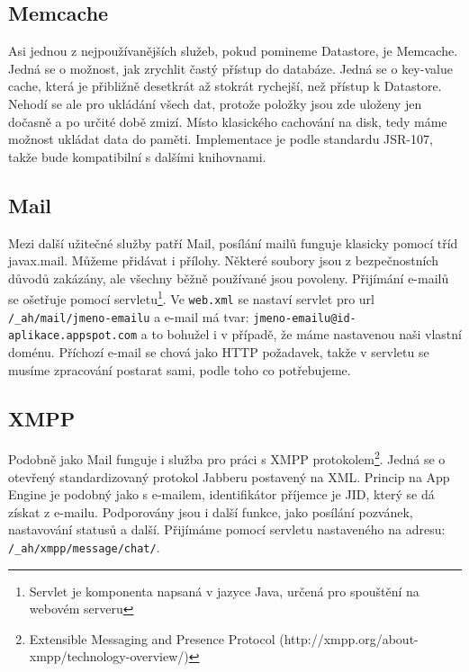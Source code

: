 \subsection{Memcache}
Asi jednou z nejpoužívanějších služeb, pokud pomineme Datastore, je Memcache. Jedná se o možnost, jak zrychlit častý přístup do databáze. Jedná se o key-value cache, která je přibližně desetkrát až stokrát rychejší, než přístup k Datastore. Nehodí se ale pro ukládání všech dat, protože položky jsou zde uloženy jen dočasně a po určité době zmizí. Místo klasického cachování na disk, tedy máme možnost ukládat data do paměti. Implementace je podle standardu JSR-107, takže bude kompatibilní s dalšími knihovnami.

\subsection{Mail}
Mezi další užitečné služby patří Mail, posílání mailů funguje klasicky pomocí tříd javax.mail. Můžeme přidávat i přílohy. Některé soubory jsou z bezpečnostních důvodů zakázány, ale všechny běžně používané jsou povoleny. Přijímání e-mailů se ošetřuje pomocí servletu\footnote{Servlet je komponenta napsaná v jazyce Java, určená pro spouštění na webovém serveru}. Ve \verb|web.xml| se nastaví servlet pro url \verb|/_ah/mail/jmeno-emailu| a e-mail má tvar: \verb|jmeno-emailu@id-aplikace.appspot.com| a to bohužel i v případě, že máme nastavenou naši vlastní doménu. Příchozí e-mail se chová jako HTTP požadavek, takže v servletu se musíme zpracování postarat sami, podle toho co potřebujeme. 

\subsection{XMPP}
Podobně jako Mail funguje i služba pro práci s XMPP protokolem\footnote{Extensible Messaging and Presence Protocol (http://xmpp.org/about-xmpp/technology-overview/)}. Jedná se o otevřený standardizovaný protokol Jabberu postavený na XML. Princip na App Engine je podobný jako s e-mailem, identifikátor příjemce je JID, který se dá získat  z e-mailu. Podporovány jsou i další funkce, jako posílání pozvánek, nastavování statusů a další. Přijímáme pomocí servletu nastaveného na adresu: \verb|/_ah/xmpp/message/chat/|.

